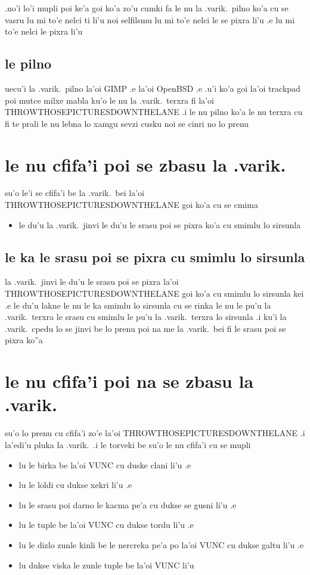 \documentclass{report}
\begin{document}
.no'i lo'i mupli poi ke'a goi ko'a zo'u cumki fa le nu la .varik.\ pilno ko'a cu se vasru lu mi to'e nelci ti li'u noi selfilsmu lu mi to'e nelci le se pixra li'u .e lu mi to'e nelci le pixra li'u

\subsection{le pilno}
uecu'i la .varik.\ pilno la'oi GIMP .e la'oi OpenBSD .e .u'i ko'a goi la'oi trackpad poi mutce milxe mabla ku'o le nu la .varik.\ terxra fi la'oi THROWTHOSEPICTURESDOWNTHELANE  .i le nu pilno ko'a le nu terxra cu fi te prali le nu lebna lo xamgu sevzi cusku noi se cinri no lo prenu

\section{le nu cfifa'i poi se zbasu la .varik.}
su'o le'i se cfifa'i be la .varik.\ bei la'oi THROWTHOSEPICTURESDOWNTHELANE goi ko'a cu se cmima
\begin{itemize}
	\item le du'u la .varik.\ jinvi le du'u le srasu poi se pixra ko'a cu smimlu lo sirsunla
\end{itemize}

\subsection{le ka le srasu poi se pixra cu smimlu lo sirsunla}
la .varik.\ jinvi le du'u le srasu poi se pixra la'oi THROWTHOSEPICTURESDOWNTHELANE goi ko'a cu smimlu lo sirsunla kei .e le du'u lakne le nu le ka smimlu lo sirsunla cu se rinka le nu le pu'u la .varik.\ terxra le srasu cu smimlu le pu'u la .varik.\ terxra lo sirsunla  .i ku'i la .varik.\ cpedu lo se jinvi be lo prenu poi na me la .varik.\ bei fi le srasu poi se pixra ko''a

\section{le nu cfifa'i poi na se zbasu la .varik.}
su'o lo prenu cu cfifa'i zo'e la'oi THROWTHOSEPICTURESDOWNTHELANE  .i la'edi'u pluka la .varik.\  .i le torveki be su'o le nu cfifa'i cu se mupli
\begin{itemize}
	\item lu le birka be la'oi VUNC cu duske clani li'u .e
	\item lu le loldi cu dukse xekri li'u .e
	\item lu le srasu poi darno le kacma pe'a cu dukse se gusni li'u .e
	\item lu le tuple be la'oi VUNC cu dukse tordu li'u .e
	\item lu le dizlo zunle kinli be le nercreka pe'a po la'oi VUNC cu dukse galtu li'u .e
	\item lu dukse viska le zunle tuple be la'oi VUNC li'u
\end{itemize}
\end{document}
